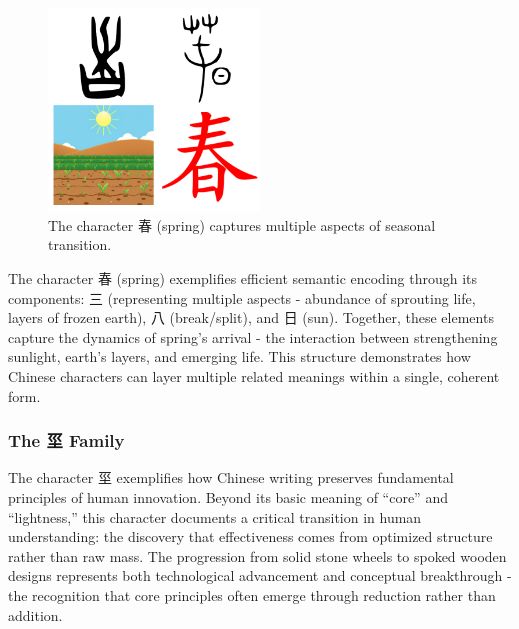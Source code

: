 \documentclass[11pt,letterpaper]{article}
\begin{document}
\begin{figure}
\centering
\includegraphics[width=0.5\textwidth]{./images/zi_spring.png}
\caption{The character 春 (spring) captures multiple aspects of seasonal
transition.}
\end{figure}

The character 春 (spring) exemplifies efficient semantic encoding
through its components: 三 (representing multiple aspects - abundance of
sprouting life, layers of frozen earth), 八 (break/split), and 日 (sun).
Together, these elements capture the dynamics of spring's arrival - the
interaction between strengthening sunlight, earth's layers, and emerging
life. This structure demonstrates how Chinese characters can layer
multiple related meanings within a single, coherent form.

\subsubsection{The 坙 Family}\label{the-ux5759-family}

The character 坙 exemplifies how Chinese writing preserves fundamental
principles of human innovation. Beyond its basic meaning of ``core'' and
``lightness,'' this character documents a critical transition in human
understanding: the discovery that effectiveness comes from optimized
structure rather than raw mass. The progression from solid stone wheels
to spoked wooden designs represents both technological advancement and
conceptual breakthrough - the recognition that core principles often
emerge through reduction rather than addition.
\end{document}

